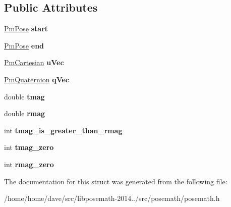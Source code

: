 \subsection*{Public Attributes}
\begin{DoxyCompactItemize}
\item 
\hypertarget{structPmLine_ac0c0df1d38527e3f726b3062a7d625c0}{}\hyperlink{structPmPose}{Pm\+Pose} {\bfseries start}\label{structPmLine_ac0c0df1d38527e3f726b3062a7d625c0}

\item 
\hypertarget{structPmLine_a9a78b09ef9d8f9e631a06663eb2aa7cd}{}\hyperlink{structPmPose}{Pm\+Pose} {\bfseries end}\label{structPmLine_a9a78b09ef9d8f9e631a06663eb2aa7cd}

\item 
\hypertarget{structPmLine_a9bc27c01a819b140c5aad8db84aa8c23}{}\hyperlink{structPmCartesian}{Pm\+Cartesian} {\bfseries u\+Vec}\label{structPmLine_a9bc27c01a819b140c5aad8db84aa8c23}

\item 
\hypertarget{structPmLine_a1b59db8f7621b457b22ec19388c9be38}{}\hyperlink{structPmQuaternion}{Pm\+Quaternion} {\bfseries q\+Vec}\label{structPmLine_a1b59db8f7621b457b22ec19388c9be38}

\item 
\hypertarget{structPmLine_aef03bfafda7c6a4d2870c3ee4f8f7109}{}double {\bfseries tmag}\label{structPmLine_aef03bfafda7c6a4d2870c3ee4f8f7109}

\item 
\hypertarget{structPmLine_a4b42d77106059d3617b5be0c1f04ae84}{}double {\bfseries rmag}\label{structPmLine_a4b42d77106059d3617b5be0c1f04ae84}

\item 
\hypertarget{structPmLine_a26bd5b75d2e65d5d816fecca7257ba86}{}int {\bfseries tmag\+\_\+is\+\_\+greater\+\_\+than\+\_\+rmag}\label{structPmLine_a26bd5b75d2e65d5d816fecca7257ba86}

\item 
\hypertarget{structPmLine_a8cee13824dcdc4eb04b187c2459d58f8}{}int {\bfseries tmag\+\_\+zero}\label{structPmLine_a8cee13824dcdc4eb04b187c2459d58f8}

\item 
\hypertarget{structPmLine_ae1eee01e0e7a04c0bc9546f5f3d4497a}{}int {\bfseries rmag\+\_\+zero}\label{structPmLine_ae1eee01e0e7a04c0bc9546f5f3d4497a}

\end{DoxyCompactItemize}


The documentation for this struct was generated from the following file\+:\begin{DoxyCompactItemize}
\item 
/home/home/dave/src/libposemath-\/2014../src/posemath/posemath.\+h\end{DoxyCompactItemize}
